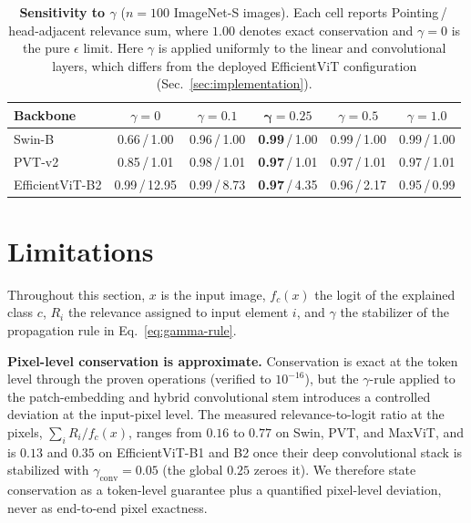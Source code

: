 \documentclass[lettersize,journal]{IEEEtran}
\theoremstyle{definition}
\theoremstyle{plain}
\begin{document}
\begin{table}[!tbp]
  \centering
  \caption{\textbf{Sensitivity to $\gamma$} ($n{=}100$ ImageNet-S images).
  Each cell reports Pointing\,/\,head-adjacent relevance sum, where $1.00$
  denotes exact conservation and $\gamma{=}0$ is the pure $\epsilon$ limit. Here
  $\gamma$ is applied uniformly to the linear and convolutional layers, which
  differs from the deployed EfficientViT configuration
  (Sec.~\ref{sec:implementation}).}
  \label{tab:gamma}
  \setlength{\tabcolsep}{3pt}
  \scriptsize
  \begin{tabular}{l ccccc}
    \toprule
    Backbone & $\gamma{=}0$ & $\gamma{=}0.1$ & $\bm{\gamma{=}0.25}$ & $\gamma{=}0.5$ & $\gamma{=}1.0$ \\
    \midrule
    Swin-B          & 0.66\,/\,1.00 & 0.96\,/\,1.00 & \textbf{0.99}\,/\,1.00 & 0.99\,/\,1.00 & 0.99\,/\,1.00 \\
    PVT-v2          & 0.85\,/\,1.01 & 0.98\,/\,1.01 & \textbf{0.97}\,/\,1.01 & 0.97\,/\,1.01 & 0.97\,/\,1.01 \\
    EfficientViT-B2 & 0.99\,/\,12.95 & 0.99\,/\,8.73 & \textbf{0.97}\,/\,4.35 & 0.96\,/\,2.17 & 0.95\,/\,0.99 \\
    \bottomrule
  \end{tabular}
\end{table}

\section{Limitations}
\label{sec:limitations}
Throughout this section, $x$ is the input image, $f_c(x)$ the logit of the explained class $c$, $R_i$ the relevance assigned to input element $i$, and $\gamma$ the stabilizer of the propagation rule in Eq.~\eqref{eq:gamma-rule}.

\textbf{Pixel-level conservation is approximate.} Conservation is exact at the token level through the proven operations (verified to $10^{-16}$), but the $\gamma$-rule applied to the patch-embedding and hybrid convolutional stem introduces a controlled deviation at the input-pixel level. The measured relevance-to-logit ratio at the pixels, $\sum_i R_i/f_c(x)$, ranges from $0.16$ to $0.77$ on Swin, PVT, and MaxViT, and is $0.13$ and $0.35$ on EfficientViT-B1 and B2 once their deep convolutional stack is stabilized with $\gamma_{\text{conv}}{=}0.05$ (the global $0.25$ zeroes it). We therefore state conservation as a token-level guarantee plus a quantified pixel-level deviation, never as end-to-end pixel exactness.
\end{document}
